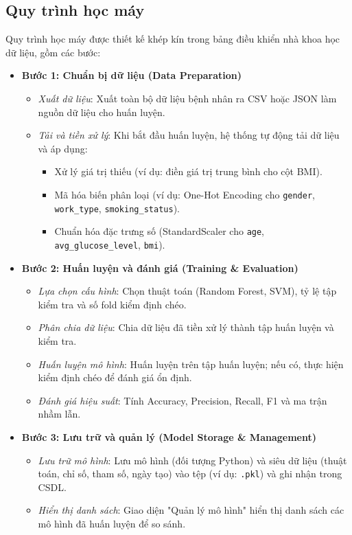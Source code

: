 ﻿\documentclass{article}
\begin{document}
\subsection{Quy trình học máy}
Quy trình học máy được thiết kế khép kín trong bảng điều khiển nhà khoa học dữ liệu, gồm các bước:
\begin{itemize}
    \item \textbf{Bước 1: Chuẩn bị dữ liệu (Data Preparation)}
    \begin{itemize}
        \item \textit{Xuất dữ liệu}: Xuất toàn bộ dữ liệu bệnh nhân ra CSV hoặc JSON làm nguồn dữ liệu cho huấn luyện.
        \item \textit{Tải và tiền xử lý}: Khi bắt đầu huấn luyện, hệ thống tự động tải dữ liệu và áp dụng:
        \begin{itemize}
            \item Xử lý giá trị thiếu (ví dụ: điền giá trị trung bình cho cột BMI).
            \item Mã hóa biến phân loại (ví dụ: One-Hot Encoding cho \texttt{gender}, \texttt{work\_type}, \texttt{smoking\_status}).
            \item Chuẩn hóa đặc trưng số (StandardScaler cho \texttt{age}, \texttt{avg\_glucose\_level}, \texttt{bmi}).
        \end{itemize}
    \end{itemize}
    
    \item \textbf{Bước 2: Huấn luyện và đánh giá (Training \& Evaluation)}
    \begin{itemize}
        \item \textit{Lựa chọn cấu hình}: Chọn thuật toán (Random Forest, SVM), tỷ lệ tập kiểm tra và số fold kiểm định chéo.
        \item \textit{Phân chia dữ liệu}: Chia dữ liệu đã tiền xử lý thành tập huấn luyện và kiểm tra.
        \item \textit{Huấn luyện mô hình}: Huấn luyện trên tập huấn luyện; nếu có, thực hiện kiểm định chéo để đánh giá ổn định.
        \item \textit{Đánh giá hiệu suất}: Tính Accuracy, Precision, Recall, F1 và ma trận nhầm lẫn.
    \end{itemize}
    
    \item \textbf{Bước 3: Lưu trữ và quản lý (Model Storage \& Management)}
    \begin{itemize}
        \item \textit{Lưu trữ mô hình}: Lưu mô hình (đối tượng Python) và siêu dữ liệu (thuật toán, chỉ số, tham số, ngày tạo) vào tệp (ví dụ: \texttt{.pkl}) và ghi nhận trong CSDL.
        \item \textit{Hiển thị danh sách}: Giao diện "Quản lý mô hình" hiển thị danh sách các mô hình đã huấn luyện để so sánh.
    \end{itemize}
    

\end{itemize}
\end{document}
